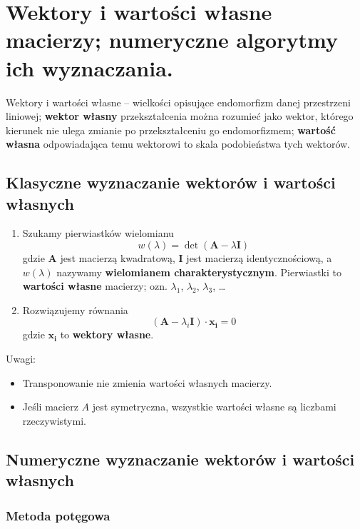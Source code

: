 \section{Wektory i wartości własne macierzy; numeryczne algorytmy ich wyznaczania.}

Wektory i wartości własne – wielkości opisujące endomorfizm danej przestrzeni liniowej;
\textbf{wektor własny} przekształcenia można rozumieć jako wektor,
którego kierunek nie ulega zmianie po przekształceniu go endomorfizmem;
\textbf{wartość własna} odpowiadająca temu wektorowi to skala podobieństwa tych wektorów.

\subsection{Klasyczne wyznaczanie wektorów i wartości własnych}

\begin{enumerate}[itemsep=0pt,partopsep=0pt, parsep=0pt]
    \item Szukamy pierwiastków wielomianu
    \[
        w(\lambda)=\det(\mathbf{A}-\lambda\mathbf{I})
    \]
    gdzie $\mathbf{A}$ jest macierzą kwadratową, $\mathbf{I}$ jest macierzą identycznościową,
    a $w(\lambda)$ nazywamy \textbf{wielomianem charakterystycznym}.
    Pierwiastki to \textbf{wartości własne} macierzy; ozn. $\lambda_1$, $\lambda_2$, $\lambda_3$, \ldots
    \item Rozwiązujemy równania
    \[
        (\mathbf{A}-\lambda_i\mathbf{I})\cdot\mathbf{x_i}=0
    \]
    gdzie $\mathbf{x_i}$ to \textbf{wektory własne}.
\end{enumerate}

Uwagi:
\begin{itemize}[itemsep=0pt,partopsep=0pt, parsep=0pt]
    \item Transponowanie nie zmienia wartości własnych macierzy.
    \item Jeśli macierz $A$ jest symetryczna, wszystkie wartości własne są liczbami rzeczywistymi.
\end{itemize}

\subsection{Numeryczne wyznaczanie wektorów i wartości własnych}

\subsubsection{Metoda potęgowa}

